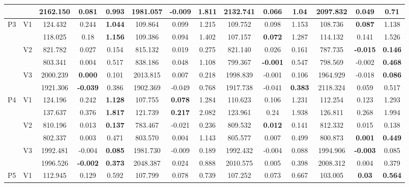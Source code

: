 \documentclass[12pt,a4paper]{article}
\begin{document}
\begin{sidewaystable}[ht]
{\begin{tabular}{cc|ccc|ccc|ccc|ccc|}
   &  & 2162.150 & 0.081 & 0.993 & 1981.057 & \textbf{-0.009} & 1.811 & 2132.741 & 0.066 & 1.04 & 2097.832 & 0.049 & \textbf{0.71} \\ 
   \hline \hline\multirow{6}{*}{P3} & \multirow{2}{*}{V1} & 124.432 & 0.244 & \textbf{1.044} & 109.864 & 0.099 & 1.215 & 109.752 & 0.098 & 1.153 & 108.736 & \textbf{0.087} & 1.138 \\ 
   &  & 118.025 & 0.18 & \textbf{1.156} & 109.386 & 0.094 & 1.402 & 107.157 & \textbf{0.072} & 1.287 & 114.132 & 0.141 & 1.526 \\ 
   & \multirow{2}{*}{V2} & 821.782 & 0.027 & 0.154 & 815.132 & 0.019 & 0.275 & 821.140 & 0.026 & 0.161 & 787.735 & \textbf{-0.015} & \textbf{0.146} \\ 
   &  & 803.341 & 0.004 & 0.517 & 838.186 & 0.048 & 1.108 & 799.367 & \textbf{-0.001} & 0.547 & 798.569 & -0.002 & \textbf{0.468} \\ 
   & \multirow{2}{*}{V3} & 2000.239 & \textbf{0.000} & 0.101 & 2013.815 & 0.007 & 0.218 & 1998.839 & -0.001 & 0.106 & 1964.929 & -0.018 & \textbf{0.086} \\ 
   &  & 1921.306 & \textbf{-0.039} & 0.386 & 1902.369 & -0.049 & 0.768 & 1917.738 & -0.041 & \textbf{0.383} & 2118.324 & 0.059 & 0.517 \\ 
   \hline \hline\multirow{6}{*}{P4} & \multirow{2}{*}{V1} & 124.196 & 0.242 & \textbf{1.128} & 107.755 & \textbf{0.078} & 1.284 & 110.623 & 0.106 & 1.231 & 112.254 & 0.123 & 1.293 \\ 
   &  & 137.637 & 0.376 & \textbf{1.817} & 121.739 & \textbf{0.217} & 2.082 & 123.961 & 0.24 & 1.938 & 126.811 & 0.268 & 1.994 \\ 
   & \multirow{2}{*}{V2} & 810.196 & 0.013 & \textbf{0.137} & 783.467 & -0.021 & 0.236 & 809.532 & \textbf{0.012} & 0.141 & 812.332 & 0.015 & 0.138 \\ 
   &  & 802.337 & 0.003 & 0.471 & 803.570 & 0.004 & 1.143 & 805.577 & 0.007 & 0.499 & 800.873 & \textbf{0.001} & \textbf{0.449} \\ 
   & \multirow{2}{*}{V3} & 1992.481 & -0.004 & \textbf{0.085} & 1981.730 & -0.009 & 0.189 & 1992.432 & -0.004 & 0.088 & 1994.906 & \textbf{-0.003} & 0.085 \\ 
   &  & 1996.526 & \textbf{-0.002} & \textbf{0.373} & 2048.387 & 0.024 & 0.888 & 2010.575 & 0.005 & 0.398 & 2008.312 & 0.004 & 0.379 \\ 
   \hline \hline\multirow{6}{*}{P5} & \multirow{2}{*}{V1} & 112.945 & 0.129 & 0.592 & 107.799 & 0.078 & 0.739 & 107.252 & 0.073 & 0.667 & 103.005 & \textbf{0.03} & \textbf{0.564} \\ 

\end{tabular}}
\end{sidewaystable}
\end{document}
